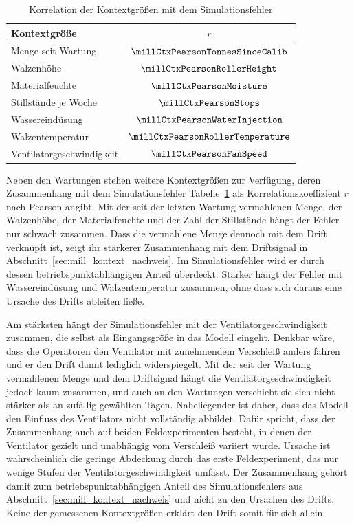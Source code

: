 \begin{table}[tbp]
\centering
\caption{Korrelation der Kontextgrößen mit dem Simulationsfehler}
\label{tab:mill_context_signals}
\begin{tabular}{lc}
\toprule
\textbf{Kontextgröße} & $r$ \\
\midrule
Menge seit Wartung         & $\millCtxPearsonTonnesSinceCalib$ \\
Walzenhöhe                 & $\millCtxPearsonRollerHeight$ \\
Materialfeuchte            & $\millCtxPearsonMoisture$ \\
Stillstände je Woche       & $\millCtxPearsonStops$ \\
Wassereindüsung            & $\millCtxPearsonWaterInjection$ \\
Walzentemperatur           & $\millCtxPearsonRollerTemperature$ \\
Ventilatorgeschwindigkeit  & $\millCtxPearsonFanSpeed$ \\
\bottomrule
\end{tabular}
\end{table}
%
Neben den Wartungen stehen weitere Kontextgrößen zur Verfügung, deren Zusammenhang mit dem Simulationsfehler Tabelle~\ref{tab:mill_context_signals} als Korrelationskoeffizient $r$ nach Pearson angibt. Mit der seit der letzten Wartung vermahlenen Menge, der Walzenhöhe, der Materialfeuchte und der Zahl der Stillstände hängt der Fehler nur schwach zusammen. Dass die vermahlene Menge dennoch mit dem Drift verknüpft ist, zeigt ihr stärkerer Zusammenhang mit dem Driftsignal in Abschnitt~\ref{sec:mill_kontext_nachweis}. Im Simulationsfehler wird er durch dessen betriebspunktabhängigen Anteil überdeckt. Stärker hängt der Fehler mit Wassereindüsung und Walzentemperatur zusammen, ohne dass sich daraus eine Ursache des Drifts ableiten ließe. \par
%
Am stärksten hängt der Simulationsfehler mit der Ventilatorgeschwindigkeit zusammen, die selbst als Eingangsgröße in das Modell eingeht. Denkbar wäre, dass die Operatoren den Ventilator mit zunehmendem Verschleiß anders fahren und er den Drift damit lediglich widerspiegelt. Mit der seit der Wartung vermahlenen Menge und dem Driftsignal hängt die Ventilatorgeschwindigkeit jedoch kaum zusammen, und auch an den Wartungen verschiebt sie sich nicht stärker als an zufällig gewählten Tagen. Naheliegender ist daher, dass das Modell den Einfluss des Ventilators nicht vollständig abbildet. Dafür spricht, dass der Zusammenhang auch auf beiden Feldexperimenten besteht, in denen der Ventilator gezielt und unabhängig vom Verschleiß variiert wurde. Ursache ist wahrscheinlich die geringe Abdeckung durch das erste Feldexperiment, das nur wenige Stufen der Ventilatorgeschwindigkeit umfasst. Der Zusammenhang gehört damit zum betriebspunktabhängigen Anteil des Simulationsfehlers aus Abschnitt~\ref{sec:mill_kontext_nachweis} und nicht zu den Ursachen des Drifts. Keine der gemessenen Kontextgrößen erklärt den Drift somit für sich allein. \par
%
%
